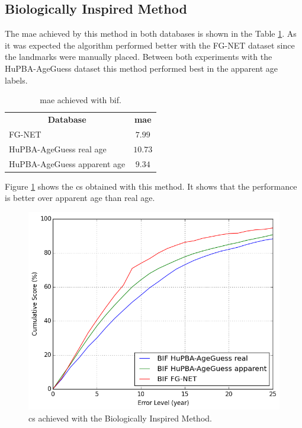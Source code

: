 \subsection{Biologically Inspired Method}

The \gls{mae} achieved by this method in both databases is shown in the Table \ref{tab:BIFresults}. As it was expected the algorithm performed better with the FG-NET dataset since the landmarks were manually placed. Between both experiments with the HuPBA-AgeGuess dataset this method performed best in the apparent age labels.

\begin{table}[!h]
	\centering
	\begin{tabular}{|l||c|}
		\hline
		\multicolumn{1}{|c||}{\textbf{Database}} & \textbf{\gls{mae}}\\ \hhline{=#=}
		FG-NET & $7.99$\\ 		\hline
		HuPBA-AgeGuess real age & $10.73$\\ \hline
		HuPBA-AgeGuess apparent age & $9.34$\\ \hline
			
	\end{tabular}
	\caption{\acrshort{mae} achieved with \acrshort{bif}.}
	\label{tab:BIFresults}
\end{table}

Figure \ref{fig:cumS_BIF} shows the \gls{cs} obtained with this method. It shows that the performance is better over apparent age than real age.

\begin{figure}[!h]
	\centering
	\includegraphics[width=\textwidth]{figures/results_hybrid_cum_score_good}
	\caption{\acrshort{cs} achieved with the Biologically Inspired Method.}
	\label{fig:cumS_BIF}
\end{figure}

